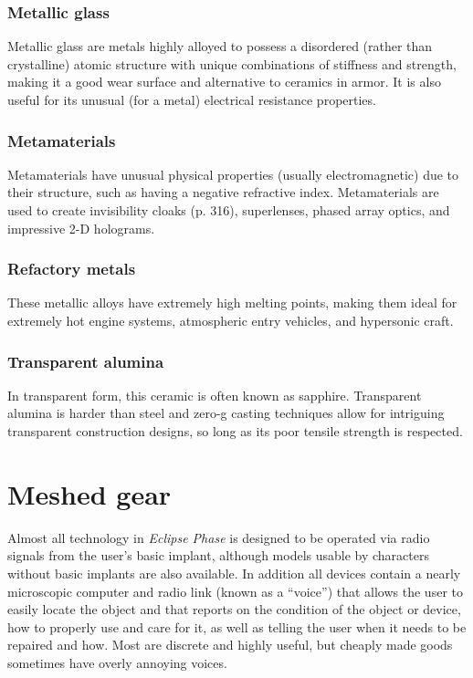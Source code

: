 \subsubsection{Metallic glass}

Metallic glass are metals highly alloyed to possess a disordered (rather than crystalline) atomic structure with unique combinations of stiffness and strength, making it a good wear surface and alternative to ceramics in armor. It is also useful for its unusual (for a metal) electrical resistance properties.

\subsubsection{Metamaterials}

Metamaterials have unusual physical properties (usually electromagnetic) due to their structure, such as having a negative refractive index. Metamaterials are used to create invisibility cloaks (p. 316), superlenses, phased array optics, and impressive 2-D holograms.

\subsubsection{Refactory metals}

These metallic alloys have extremely high melting points, making them ideal for extremely hot engine systems, atmospheric entry vehicles, and hypersonic craft.

\subsubsection{Transparent alumina}

In transparent form, this ceramic is often known as sapphire. Transparent alumina is harder than steel and zero-g casting techniques allow for intriguing transparent construction designs, so long as its poor tensile strength is respected.


\section{Meshed gear}
\label{sec:meshed-gear}

Almost all technology in \emph{Eclipse Phase} is designed to be operated via radio signals from the user’s basic implant, although models usable by characters without basic implants are also available. In addition all devices contain a nearly microscopic computer and radio link (known as a ``voice'') that allows the user to easily locate the object and that reports on the condition of the object or device, how to properly use and care for it, as well as telling the user when it needs to be repaired and how. Most are discrete and highly useful, but cheaply made goods sometimes have overly annoying voices.

